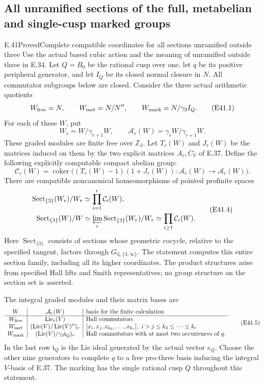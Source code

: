 \subsection{All unramified sections of the full, metabelian and single-cusp marked groups}

\begin{statement}{E.41}{Proved}{Complete compatible coordinates for all sections unramified outside three}
Use the actual based cubic action and the meaning of unramified
outside three in E.34. Let $Q=B_0$ be the rational cusp over one,
let $q$ be its positive peripheral generator, and let $I_Q$ be
its closed normal closure in $N$. All commutator subgroups below
are closed. Consider the three actual arithmetic quotients
\[
 W_{\rm free}=N,\qquad W_{\rm met}=N/N'',\qquad
 W_{\rm mark}=N/\gamma_3I_Q.
 \tag{E41.1}
\]
For each of these $W$, put
\[
 W_r=W/\gamma_{r+1}W,\qquad
 \mathcal A_r(W)=\gamma_rW/\gamma_{r+1}W.
 \tag{E41.2}
\]
These graded modules are finite free over $\mathbb Z_3$.
Let $T_r(W)$ and $J_r(W)$ be the matrices induced on them
by the two explicit matrices $A_\tau,C_V$ of E.37. Define
the following explicitly computable compact abelian group:
\[
 \mathcal C_r(W)=
 \operatorname{coker}\bigl((T_r(W)-1)(1+J_r(W)):
              \mathcal A_r(W)\longrightarrow\mathcal A_r(W)\bigr).
 \tag{E41.3}
\]
There are compatible noncanonical homeomorphisms of pointed
profinite spaces
\[
 \begin{split}
 \operatorname{Sect}_{\{3\}}(W_r)/W_r
       &\simeq\prod_{i=1}^r\mathcal C_i(W),\\
 \operatorname{Sect}_{\{3\}}(W)/W
       &\simeq\varprojlim_r\operatorname{Sect}_{\{3\}}(W_r)/W_r
        \simeq\prod_{i\ge1}\mathcal C_i(W).
 \end{split}
 \tag{E41.4}
\]
Here $\operatorname{Sect}_{\{3\}}$ consists of sections whose
geometric cocycle, relative to the specified tangent, factors
through $G_{\mathbb Q,\{3,\infty\}}$. The statement computes
this entire section family, including all its higher
coordinates. The product structures arise from specified
Hall lifts and Smith representatives; no group structure
on the section set is asserted.

The integral graded modules and their matrix bases are
\[
\begin{array}{c|c|l}
W&\mathcal A_r(W)&\text{basis for the finite calculation}\\ \hline
W_{\rm free}&\operatorname{Lie}_r(V)&\text{Hall commutators}\\
W_{\rm met}&(\operatorname{Lie}(V)/\operatorname{Lie}(V)'')_r
 & [x_i,x_j,x_{k_3},\ldots,x_{k_r}],\ i>j\le k_3\le\cdots\le k_r\\
W_{\rm mark}&
 (\operatorname{Lie}(V)/\gamma_3\mathfrak i_Q)_r
 &\text{Hall commutators with at most two occurrences of }q .
\end{array}
 \tag{E41.5}
\]
In the last row $\mathfrak i_Q$ is the Lie ideal generated by
the actual vector $e_Q$. Choose the other nine generators
to complete $q$ to a free pro-three basis inducing the
integral $V$-basis of E.37. The marking has the single
rational cusp $Q$ throughout this statement.


\end{statement}
